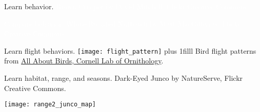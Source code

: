 \documentclass[t]{beamer}
\begin{document}
{
\begin{frame}[b,plain]{Learn behavior.}
	\tiny\hfill\textcolor{white}{Brown Creeper by David Mitchell, Flickr Creative Commons.}
\end{frame}
}

{
\begin{frame}[b,plain]{\hfill\textcolor{white}{Compare behavior.}}
	\tiny\textcolor{white}{White-Breasted Nuthatch by Matt MacGillivray, Flickr Creative Commons.}
\end{frame}
}

{
\begin{frame}[c,plain]{Learn flight behaviors.}
	\texttt{[image: flight\_pattern]}
\vskip0pt plus 1filll	
	\hfill\tiny Bird flight patterns from \href{http://allaboutbirds.com}{All About Birds, Cornell Lab of Ornithology}.
\end{frame}
}

{
\begin{frame}[b,plain]{Learn habitat, range, and seasons.}
	\tiny\hfill Dark-Eyed Junco by NatureServe, Flickr Creative Commons.
\end{frame}
}

\begin{frame}[b,plain]
	\begin{center}
		\texttt{[image: range2\_junco\_map]}
	\end{center}
\end{frame}
\end{document}
